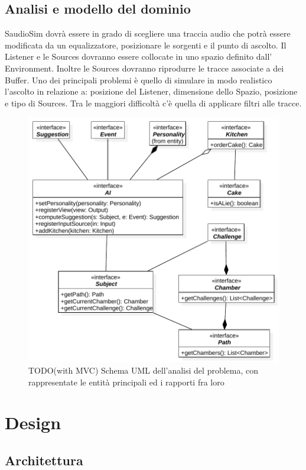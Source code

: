 \documentclass[a4paper,12pt]{report}
\begin{document}
\section{Analisi e modello del dominio}
SaudioSim dovrà essere in grado di scegliere una traccia audio che potrà essere modificata da un equalizzatore, posizionare le sorgenti e il punto di ascolto. Il Listener e le Sources dovranno essere collocate in uno spazio definito dall' Environment. Inoltre le Sources dovranno riprodurre le tracce associate a dei Buffer.
%
Uno dei principali problemi è quello di simulare in modo realistico l'ascolto in relazione a: posizione del Listener, dimensione dello Spazio, posizione e tipo di Sources. Tra le maggiori difficoltà c'è quella di applicare filtri alle tracce.
\begin{figure}[H]
\centering{}
\includegraphics{img/analysis.pdf}
\caption{ TODO(with MVC) Schema UML dell'analisi del problema, con rappresentate le entità principali ed i rapporti fra loro}
\label{img:analysis}
\end{figure}


\chapter{Design}
\section{Architettura}
\end{document}

